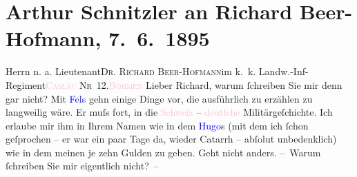 

               \section[Arthur Schnitzler an Richard Beer-Hofmann, 7. 6. 1895]{ Arthur Schnitzler an Richard Beer-Hofmann, 7. 6. 1895}\nopagebreak{}\rehead{ }\normalsize\beginnumbering{} \toendnotes[C]{\smallbreak\pagebreak[2]} 
\toendnotes[C]{\smallbreak}\pstart{}Herrn n. a. Lieutenant\pend{}\pstart{}{\pb}\textsc{Dr. Richard Beer-Hofmann}\pend{}\pstart{}im k. k. Landw.-Inf-Regiment\pend{}\pstart{}\textsc{\textcolor{pink}{Caslau}{}\ledrightnote{\textcolor{pink}{Caslau}} Nr 12}.\pend{}\pstart{}\textsc{\textcolor{pink}{Böhmen}{}\ledrightnote{\textcolor{pink}{Böhmen}}}\pend{}{\bigskip}\pstart
           \noindent{}{\pb}Lieber Richard, warum ſchreiben Sie mir denn gar nicht?\pend
           \pstart
           Mit \textcolor{blue}{Fels}{}\ledrightnote{\textcolor{blue}{Friedrich Michael Fels}} gehn einige Dinge vor, die ausführlich zu
               erzählen zu langweilig wäre. Er muſs fort, in die \textcolor{pink}{Schweiz}{}\ledrightnote{\textcolor{pink}{Schweiz}} – \textcolor{pink}{deutſche}{}\ledrightnote{\textcolor{pink}{Deutschland}} Militärgeſchichte. Ich
               erlaube mir ihm in Ihrem Namen wie in dem \textcolor{blue}{Hugo}{}\ledrightnote{\textcolor{blue}{Hugo von Hofmannsthal}}s
               (mit dem ich ſchon geſprochen – er war ein paar Tage da, wieder Catarrh – abſolut
               unbedenklich) wie in dem meinen je zehn Gulden zu geben. Geht nicht anders.\pend
           \pstart
           {\pb}– Warum ſchreiben Sie mir eigentlich nicht? –\pend
           \pstart
